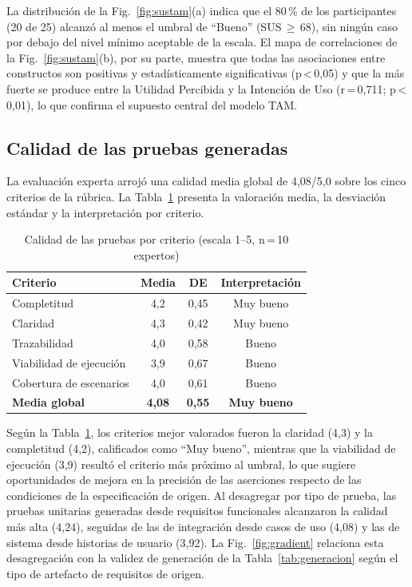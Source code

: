 \documentclass[10pt,journal,twoside,letterpaper]{IEEEtran}
\begin{document}
    La distribución de la Fig.~\ref{fig:sustam}(a) indica que el 80\,\% de los participantes (20 de 25) alcanzó al menos el umbral de ``Bueno'' (SUS\,$\geq$\,68), sin ningún caso por debajo del nivel mínimo aceptable de la escala. El mapa de correlaciones de la Fig.~\ref{fig:sustam}(b), por su parte, muestra que todas las asociaciones entre constructos son positivas y estadísticamente significativas (p\,<\,0,05) y que la más fuerte se produce entre la Utilidad Percibida y la Intención de Uso (r\,=\,0,711; p\,<\,0,01), lo que confirma el supuesto central del modelo TAM.
    
    \subsection{Calidad de las pruebas generadas}
    \label{subsec:calidad}
    
    La evaluación experta arrojó una calidad media global de 4,08/5,0 sobre los cinco criterios de la rúbrica. La Tabla~\ref{tab:calidad} presenta la valoración media, la desviación estándar y la interpretación por criterio.
    
    \begin{table}[!tb]
        \caption{Calidad de las pruebas por criterio (escala 1--5, n\,=\,10 expertos)}
        \label{tab:calidad}
        \centering
        \small
        \begin{tabular}{@{}lccc@{}}
            \toprule
            \textbf{Criterio} & \textbf{Media} & \textbf{DE} & \textbf{Interpretación} \\
            \midrule
            Completitud            & 4,2 & 0,45 & Muy bueno \\
            Claridad               & 4,3 & 0,42 & Muy bueno \\
            Trazabilidad           & 4,0 & 0,58 & Bueno \\
            Viabilidad de ejecución & 3,9 & 0,67 & Bueno \\
            Cobertura de escenarios & 4,0 & 0,61 & Bueno \\
            \midrule
            \textbf{Media global}  & \textbf{4,08} & \textbf{0,55} & \textbf{Muy bueno} \\
            \bottomrule
        \end{tabular}
    \end{table}
    
    Según la Tabla~\ref{tab:calidad}, los criterios mejor valorados fueron la claridad (4,3) y la completitud (4,2), calificados como ``Muy bueno'', mientras que la viabilidad de ejecución (3,9) resultó el criterio más próximo al umbral, lo que sugiere oportunidades de mejora en la precisión de las aserciones respecto de las condiciones de la especificación de origen. Al desagregar por tipo de prueba, las pruebas unitarias generadas desde requisitos funcionales alcanzaron la calidad más alta (4,24), seguidas de las de integración desde casos de uso (4,08) y las de sistema desde historias de usuario (3,92). La Fig.~\ref{fig:gradient} relaciona esta desagregación con la validez de generación de la Tabla~\ref{tab:generacion} según el tipo de artefacto de requisitos de origen.
    
\end{document}
